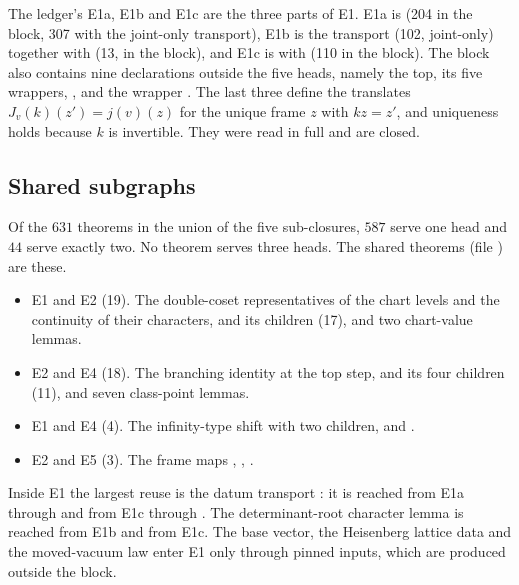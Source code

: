 \documentclass[11pt]{article}
\theoremstyle{remark}
\begin{document}
\noindent The ledger's E1a, E1b and E1c are the three parts of E1. E1a is  (204 in the block, 307 with the joint-only transport), E1b is the transport  (102, joint-only) together with  (13, in the block), and E1c is  with  (110 in the block). The block also contains nine declarations outside the five heads, namely the top, its five wrappers, ,  and the wrapper . The last three define the translates $J_v(k)(z')=j(v)(z)$ for the unique frame $z$ with $k z=z'$, and uniqueness holds because $k$ is invertible. They were read in full and are closed.

\subsection{Shared subgraphs}
Of the $631$ theorems in the union of the five sub-closures, $587$ serve one head and $44$ serve exactly two. No theorem serves three heads. The shared theorems (file ) are these.
\begin{itemize}[leftmargin=*,itemsep=1pt]
\item E1 and E2 (19). The double-coset representatives of the chart levels and the continuity of their characters,  and its children (17), and two chart-value lemmas.
\item E2 and E4 (18). The branching identity at the top step,  and its four children (11), and seven class-point lemmas.
\item E1 and E4 (4). The infinity-type shift  with two children, and .
\item E2 and E5 (3). The frame maps , , .
\end{itemize}
Inside E1 the largest reuse is the datum transport : it is reached from E1a through  and from E1c through . The determinant-root character lemma  is reached from E1b and from E1c. The base vector, the Heisenberg lattice data and the moved-vacuum law enter E1 only through pinned inputs, which are produced outside the block.
\end{document}
